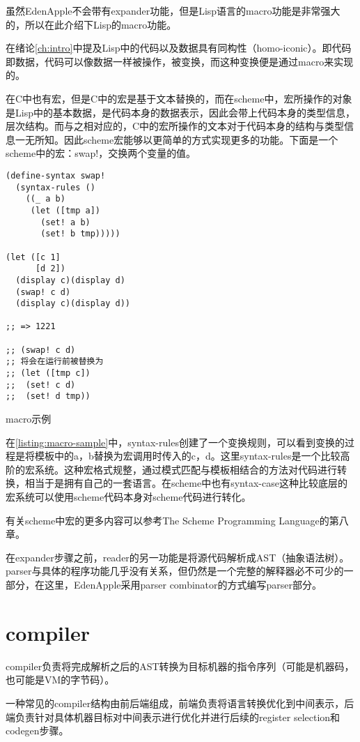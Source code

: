 虽然EdenApple不会带有expander功能，但是Lisp语言的macro功能是非常强大的，所以在此介绍下Lisp的macro功能。

在绪论\ref{ch:intro}中提及Lisp中的代码以及数据具有同构性（homo-iconic）。即代码即数据，代码可以像数据一样被操作，被变换，而这种变换便是通过macro来实现的。

在C中也有宏，但是C中的宏是基于文本替换的，而在scheme中，宏所操作的对象是Lisp中的基本数据，是代码本身的数据表示，因此会带上代码本身的类型信息，层次结构。而与之相对应的，C中的宏所操作的文本对于代码本身的结构与类型信息一无所知。因此scheme宏能够以更简单的方式实现更多的功能。下面是一个scheme中的宏：swap!，交换两个变量的值。

\begin{code}
\begin{verbatim}
(define-syntax swap!
  (syntax-rules ()
    ((_ a b)
     (let ([tmp a])
       (set! a b)
       (set! b tmp)))))

(let ([c 1]
      [d 2])
  (display c)(display d)
  (swap! c d)
  (display c)(display d))

;; => 1221

;; (swap! c d) 
;; 将会在运行前被替换为
;; (let ([tmp c])
;;  (set! c d)
;;  (set! d tmp))
\end{verbatim}
\caption{macro示例}
\label{listing:macro-sample}
\end{code}

在\ref{listing:macro-sample}中，syntax-rules创建了一个变换规则，可以看到变换的过程是将模板中的a，b替换为宏调用时传入的c，d。这里syntax-rules是一个比较高阶的宏系统。这种宏格式规整，通过模式匹配与模板相结合的方法对代码进行转换，相当于是拥有自己的一套语言。在scheme中也有syntax-case这种比较底层的宏系统可以使用scheme代码本身对scheme代码进行转化。

有关scheme中宏的更多内容可以参考The Scheme Programming Language\cite{dybvig09scm}的第八章。

在expander步骤之前，reader的另一功能是将源代码解析成AST（抽象语法树）。parser与具体的程序功能几乎没有关系，但仍然是一个完整的解释器必不可少的一部分，在这里，EdenApple采用parser combinator的方式编写parser部分。

\section{compiler}

compiler负责将完成解析之后的AST转换为目标机器的指令序列（可能是机器码，也可能是VM的字节码）。

一种常见的compiler结构由前后端组成，前端负责将语言转换优化到中间表示，后端负责针对具体机器目标对中间表示进行优化并进行后续的register selection和codegen步骤。

